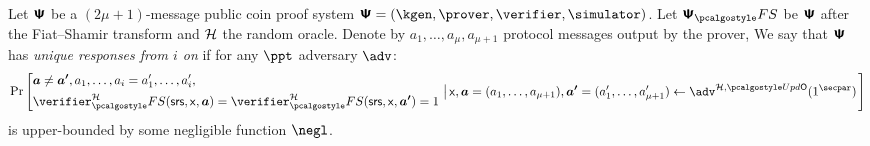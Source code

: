 %

\begin{definition}
	\label{def:wiuru}
	Let $\bm{\mathsf{\Psi}}$ be a $(2\mu + 1)$-message public coin proof system
	$\ps = (\kgen, \prover, \verifier, \simulator)$. Let $\proofsystem_\fs$ be
	$\bm{\mathsf{\Psi}}$ after the Fiat--Shamir transform and $\mathcal{H}$ the random
	oracle. Denote by $a_1, \ldots, a_{\mu}, a_{\mu + 1}$ protocol messages output
	by the prover, We say that $\bm{\mathsf{\Psi}}$ has \emph{unique responses from $i$
		on} if for any $\ppt$ adversary $\adv$:
	\[
	\Pr\left[
	\begin{aligned}
	& \vec{a} \neq \vec{a'}, a_1, \ldots, a_{i} = a'_1,
	\ldots, a'_{i}, \\
	& \verifier^\ro_\fs (\srs, \inp, \vec{a}) =
	\verifier^\ro_\fs(\srs, \inp, \vec{a'}) = 1  \\
	\end{aligned}
	\,\left|\,
	\begin{aligned}
	& \inp, \vec{a} = (a_1, \ldots, a_{\mu + 1}), \vec{a'} = (a'_1, \ldots,
	a'_{\mu + 1})
	\gets \adv^{\ro, \initU}(1^\secpar) \\
	\end{aligned}
	\right.\right]
	\]
	is upper-bounded by some negligible function $\negl$. 
\end{definition}

